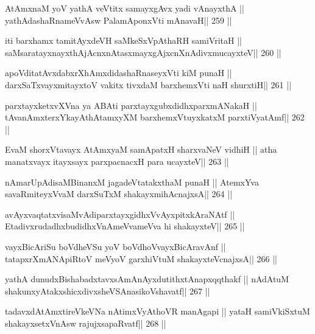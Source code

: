 \begin{shl}
AtAmxnaM yoV yathA veVtitx samayxgAvx yadi vA\s nayxthA ||
yathAdashaRnameVvAsw PalamAponxVti mAnavaH\hfill || 259 ||
\end{shl}

\begin{shl}
iti barxhamx tamitAyxdeVH saMkeSxVpAthaRH samiVritaH ||
saMsaratayxnayxthAjAcnxnAtasxmayxgAjxcnXnAdivxmucayxteV\hfill || 260 ||
\end{shl}

\begin{shl}
apoVditatAvxdabxrXhAmxdidashaRnaseyxVti kiM punaH ||
darxSaTxvayxmitayxtoV vakitx tivxdaM barxhemxVti naH shurxtiH\hfill || 261 ||
\end{shl}

\begin{shl}
parxtayxketxvXVna ya ABAti parxtayxgubxdidhxparxmANakaH ||
tAvanAmxterxYkayAthAtamxyXM barxhemxVtuyxkatxM parxtiVyatAmf\hfill || 262 ||
\end{shl}

\begin{shl}
EvaM shorxVtavayx AtAmx\s yaM samApatxH sharxvaNeV vidhiH ||
atha manatxvayx itayxsayx parxpacnacxH para ucayxteV\hfill || 263 ||
\end{shl}

\begin{shl}
nAmarUpAdisaMBinanxM jagadeVtatakxthaM punaH ||
AtemxYva savaRmiteyxVvaM darxSuTxM shakayxmihAcnajxsA\hfill || 264 ||
\end{shl}

\begin{shl}
avAyxvaqtatxvisaMvAdiparxtayxgidhxVvAyxpitxkAraNAtf ||
EtadivxrudadhxbudidhxVnAmeVvameVva hi shakayxteV\hfill || 265 ||
\end{shl}

\begin{shl}
vayxBicAriSu boVdheVSu yoV boVdhoV\s vayxBicAravAnf ||
tatapxrXmANApiRtoV meVyoV garxhiVtuM shakayxteV\s cnajxsA\hfill || 266 ||
\end{shl}

\begin{shl}
yathA dunudxBishabadxtavxsAmAnAyxdutithxtAnapxqqthakf ||
nA\s\s dAtuM shakunxyAtakxshicxdivxsheVSAnasikoVshavatf\hfill || 267 ||
\end{shl}

\begin{shl}
tadavxdAtAmxtireVkeVNa nA\s\s timxVyAthoVR manAgapi ||
yataH samiVkiSxtuM shakayxsetxVnAsw rajujxsapaRvatf\hfill || 268 ||
\end{shl}

